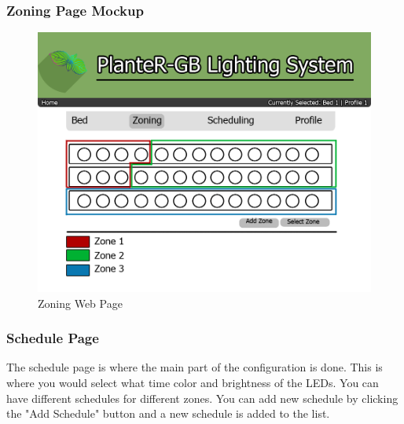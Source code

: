 \documentclass[onecolumn, draftclsnofoot,10pt, compsoc]{IEEEtran}
\begin{document}
			            \subsubsection{Zoning Page Mockup}
			            \begin{center}
			                \begin{figure}[H]
			                    \includegraphics[width=\linewidth]{web_design/ZoningPage.png}
			                    \caption{Zoning Web Page}
			                    \label{fig:Zoning Page}
			                \end{figure}
			            \end{center}
			            \subsubsection{Schedule Page}
			            The schedule page is where the main part of the configuration is done.
			            This is where you would select what time color and brightness of the LEDs.
			            You can have different schedules for different zones. You can add new schedule
			            by clicking the "Add Schedule" button and a new schedule is added to the
			            list.
\end{document}
